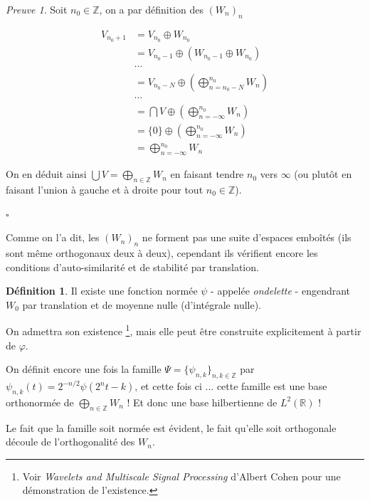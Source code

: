 \documentclass[]{article}
\theoremstyle{remark}
\newtheorem{myproof}{Preuve}
\theoremstyle{definition}
\newtheorem{mydef}{Définition}
\newcommand{\cqfd}{
	\hfill$\square$
}
\newcommand{\DS}{\displaystyle}
\begin{document}
	\begin{myproof}
		Soit $n_0 \in \mathbb{Z}$, on a par définition des $(W_{n})_n$
		
		\begin{align*}
			V_{n_0+1} &= V_{n_0} \oplus W_{n_0} \\
			&= V_{n_0 - 1} \oplus \left(W_{n_0 - 1} \oplus W_{n_0} \right) \\
			& \cdots \\
			&= V_{n_0 - N} \oplus \left(\bigoplus_{n = n_0 - N}^{n_0} W_n \right) \\
			& \cdots \\
			&= \bigcap V \oplus \left(\bigoplus_{n = - \infty}^{n_0} W_n \right) \\
			&= \{0\} \oplus \left(\bigoplus_{n = - \infty}^{n_0} W_n \right) \\
			&= \bigoplus_{n = - \infty}^{n_0} W_n
		\end{align*}
		
		On en déduit ainsi $\DS \bigcup V = \bigoplus_{n \in \mathbb{Z}} W_n$ en faisant tendre $n_0$ vers $\infty$ (ou plutôt en faisant l'union à gauche et à droite pour tout $n_0 \in \mathbb{Z}$).
		
		\cqfd
	\end{myproof}
	
	Comme on l'a dit, les $(W_n)_n$ ne forment pas une suite d'espaces emboîtés (ils sont même orthogonaux deux à deux), cependant ils vérifient encore les conditions d'auto-similarité et de stabilité par translation.

	\begin{mydef}
		Il existe une fonction normée $\psi$ - appelée \textit{ondelette} - engendrant $W_0$ par translation et de moyenne nulle (d'intégrale nulle).
		
		On admettra son existence \footnote{Voir \textit{Wavelets and Multiscale Signal Processing} d'Albert Cohen pour une démonstration de l'existence.}, mais elle peut être construite explicitement à partir de $\varphi$.
	\end{mydef}
		
	On définit encore une fois la famille $\Psi = \{\psi_{n, k}\}_{n, k \in \mathbb{Z}}$ par $\psi_{n, k}(t) = 2^{-n/2} \psi(2^{n} t - k)$, et cette fois ci ... cette famille est une base orthonormée de $\DS \bigoplus_{n \in \mathbb{Z}} W_n$ ! Et donc une base hilbertienne de $L^2(\mathbb{R})$ !
	
	Le fait que la famille soit normée est évident, le fait qu'elle soit orthogonale découle de l'orthogonalité des $W_n$.
	
\end{document}
